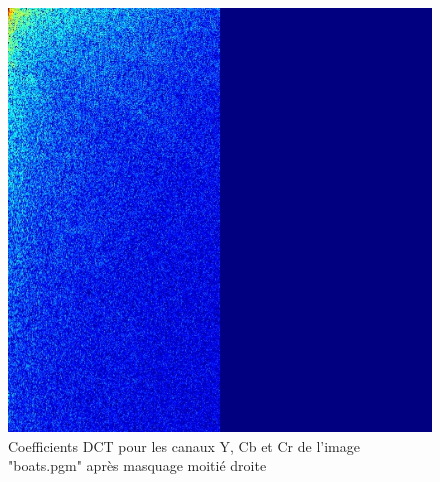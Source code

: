 \documentclass[12pt]{report}
\begin{document}
\begin{figure}[H]
\begin{center}
\includegraphics[scale=0.25]{../ImageRes/dct_masked1_2.jpg} 
\caption{Coefficients DCT pour les canaux Y, Cb et Cr de l'image "boats.pgm" après masquage moitié droite}
\end{center}
\end{figure}
\end{document}
